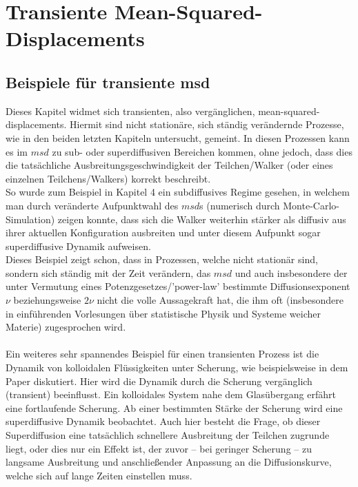 \documentclass[a4paper, 12pt]{report}
\begin{document}
\chapter{Transiente Mean-Squared-Displacements}
\section{Beispiele für transiente msd}
Dieses Kapitel widmet sich transienten, also vergänglichen, mean-squared-displacements. Hiermit sind nicht stationäre, sich ständig verändernde Prozesse, wie in den beiden letzten Kapiteln untersucht, gemeint. In diesen Prozessen kann es im $msd$ zu sub- oder superdiffusiven Bereichen kommen, ohne jedoch, dass dies die tatsächliche Ausbreitungsgeschwindigkeit der Teilchen/Walker (oder eines einzelnen Teilchens/Walkers) korrekt beschreibt.
\\
So wurde zum Beispiel in Kapitel 4 ein subdiffusives Regime gesehen, in welchem man durch veränderte Aufpunktwahl des $msd$s (numerisch durch Monte-Carlo-Simulation) zeigen konnte, dass sich die Walker weiterhin stärker als diffusiv aus ihrer aktuellen Konfiguration ausbreiten und unter diesem Aufpunkt sogar superdiffusive Dynamik aufweisen.
\\
Dieses Beispiel zeigt schon, dass in Prozessen, welche nicht stationär sind, sondern sich ständig mit der Zeit verändern, das $msd$ und auch insbesondere der unter Vermutung eines Potenzgesetzes/'power-law' bestimmte Diffusionsexponent $\nu$ beziehungsweise $2\nu$ nicht die volle Aussagekraft hat, die ihm oft (insbesondere in einführenden Vorlesungen über statistische Physik und Systeme weicher Materie) zugesprochen wird.
\\
\\
Ein weiteres sehr spannendes Beispiel für einen transienten Prozess ist die Dynamik von kolloidalen Flüssigkeiten unter Scherung, wie beispielsweise in dem Paper \cite{Zausch_2008} diskutiert. Hier wird die Dynamik durch die Scherung vergänglich (transient) beeinflusst. Ein kolloidales System nahe dem Glasübergang erfährt eine fortlaufende Scherung. Ab einer bestimmten Stärke der Scherung wird eine superdiffusive Dynamik beobachtet. Auch hier besteht die Frage, ob dieser Superdiffusion eine tatsächlich schnellere Ausbreitung der Teilchen zugrunde liegt, oder dies nur ein Effekt ist, der zuvor -- bei geringer Scherung -- zu langsame Ausbreitung und anschließender Anpassung an die Diffusionskurve, welche sich auf lange Zeiten einstellen muss.
\end{document}
